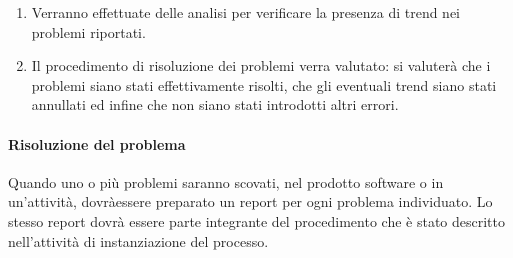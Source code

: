 \begin{enumerate}
\begin{center}
\begin{longtable}{|c|c|c|c|}
						\end{longtable}
					\end{center}

				\item Verranno effettuate delle analisi per verificare la presenza di trend nei problemi riportati.

				\item Il procedimento di risoluzione dei problemi verra valutato: si valuterà che i problemi siano stati effettivamente risolti, che gli eventuali trend siano stati annullati ed infine che non siano stati introdotti altri errori.
			\end{enumerate}	
		\paragraph{Risoluzione del problema}
			Quando uno o più problemi saranno scovati, nel prodotto software o in un'attività, dovràessere preparato un report per ogni problema individuato. Lo stesso report dovrà essere parte integrante del procedimento che è stato descritto nell'attività di instanziazione del processo.
